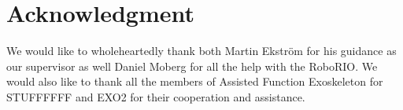 \section*{Acknowledgment}

We would like to wholeheartedly thank both Martin Ekström for his guidance as our supervisor as well Daniel Moberg for all the help with
the RoboRIO. We would also like to thank all the members of Assisted Function Exoskeleton for STUFFFFFF and EXO2 for their cooperation and
assistance.
